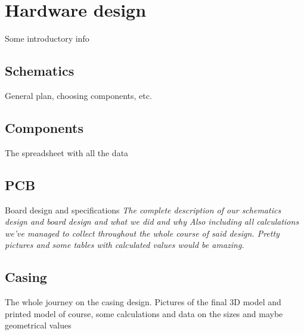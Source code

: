 \section{Hardware design}

Some introductory info

\subsection{Schematics}

General plan, choosing components, etc.

\subsection{Components}

The spreadsheet with all the data

\subsection{PCB}

Board design and specifications
\textit{The complete description of our schematics design and board design and what we did and why
Also including all calculations we've managed to collect throughout the whole course of said design.
Pretty pictures and some tables with calculated values would be amazing.}

\subsection{Casing}

The whole journey on the casing design. Pictures of the final 3D model and printed model of course, some calculations and data on the sizes and maybe geometrical values 






